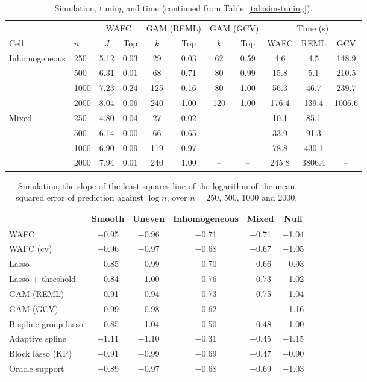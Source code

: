 \begin{table}[tp]
\color{colR1}
\caption{Simulation, tuning and time (continued from Table~\ref{tab:sim-tuning}).}
\label{tab:sim-tuning-b}
\centering
\footnotesize
\setlength{\tabcolsep}{4pt}
\begin{tabular}{ll cc cc cc ccc}
\hline
 & & \multicolumn{2}{c}{WAFC} & \multicolumn{2}{c}{GAM (REML)} & \multicolumn{2}{c}{GAM (GCV)} & \multicolumn{3}{c}{Time (s)} \\
Cell & $n$ & $J$ & Top & $k$ & Top & $k$ & Top & WAFC & REML & GCV \\
\hline
Inhomogeneous & 250 & 5.12 & 0.03 & 29 & 0.03 & 62 & 0.59 & 4.6 & 4.5 & 148.9 \\
 & 500 & 6.31 & 0.01 & 68 & 0.71 & 80 & 0.99 & 15.8 & 5.1 & 210.5 \\
 & 1000 & 7.23 & 0.24 & 125 & 0.16 & 80 & 1.00 & 56.3 & 46.7 & 239.7 \\
 & 2000 & 8.04 & 0.06 & 240 & 1.00 & 120 & 1.00 & 176.4 & 139.4 & 1006.6 \\
Mixed & 250 & 4.80 & 0.04 & 27 & 0.02 & -- & -- & 10.1 & 85.1 & -- \\
 & 500 & 6.14 & 0.00 & 66 & 0.65 & -- & -- & 33.9 & 91.3 & -- \\
 & 1000 & 6.90 & 0.09 & 119 & 0.97 & -- & -- & 78.8 & 430.1 & -- \\
 & 2000 & 7.94 & 0.01 & 240 & 1.00 & -- & -- & 245.8 & 3806.4 & -- \\
\hline
\end{tabular}
\end{table}

\begin{table}[tp]
\color{colR1}
\caption{Simulation, the slope of the least squares line of the logarithm of the mean squared error of prediction against $\log n$, over $n = 250$, 500, 1000 and 2000.}
\label{tab:sim-slopes}
\centering
\small
\setlength{\tabcolsep}{6pt}
\begin{tabular}{lccccc}
\hline
 & Smooth & Uneven & Inhomogeneous & Mixed & Null \\
\hline
WAFC & $-$0.95 & $-$0.96 & $-$0.71 & $-$0.71 & $-$1.04 \\
WAFC (cv) & $-$0.96 & $-$0.97 & $-$0.68 & $-$0.67 & $-$1.05 \\
Lasso & $-$0.85 & $-$0.99 & $-$0.70 & $-$0.66 & $-$0.93 \\
Lasso + threshold & $-$0.84 & $-$1.00 & $-$0.76 & $-$0.73 & $-$1.02 \\
GAM (REML) & $-$0.91 & $-$0.94 & $-$0.73 & $-$0.75 & $-$1.04 \\
GAM (GCV) & $-$0.99 & $-$0.98 & $-$0.62 & -- & $-$1.16 \\
B-spline group lasso & $-$0.85 & $-$1.04 & $-$0.50 & $-$0.48 & $-$1.00 \\
Adaptive spline & $-$1.11 & $-$1.10 & $-$0.31 & $-$0.45 & $-$1.15 \\
Block lasso (KP) & $-$0.91 & $-$0.99 & $-$0.69 & $-$0.47 & $-$0.90 \\
Oracle support & $-$0.89 & $-$0.97 & $-$0.68 & $-$0.69 & $-$1.03 \\
\hline
\end{tabular}
\end{table}

